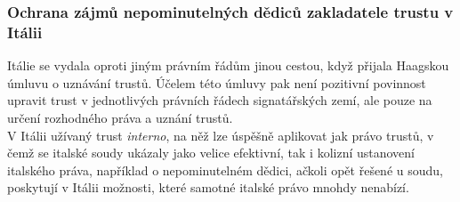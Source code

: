 \documentclass{article}
\begin{document}



\subsubsection{Ochrana zájmů nepominutelných dědiců zakladatele trustu v Itálii}

Itálie se vydala oproti jiným právním řádům jinou cestou, když přijala Haagskou úmluvu o uznávání trustů. Účelem této úmluvy pak není pozitivní povinnost upravit trust v jednotlivých právních řádech signatářských zemí, ale pouze na určení rozhodného práva a uznání trustů.\\

V Itálii užívaný trust \textit{interno}, na něž lze úspěšně aplikovat jak právo trustů, v čemž se italské soudy ukázaly jako velice efektivní, tak i kolizní ustanovení italského práva, například o nepominutelném dědici, ačkoli opět řešené u soudu, poskytují v Itálii možnosti, které samotné italské právo mnohdy nenabízí.\\
\end{document}
